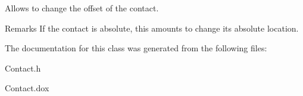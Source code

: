 Allows to change the offset of the contact.

\begin{DoxyRemark}{Remarks}
If the contact is absolute, this amounts to change its absolute location. 
\end{DoxyRemark}


The documentation for this class was generated from the following files\+:\begin{DoxyCompactItemize}
\item 
Contact.\+h\item 
Contact.\+dox\end{DoxyCompactItemize}
